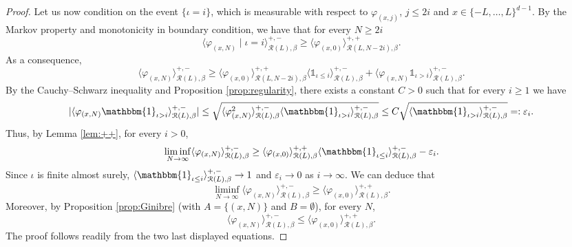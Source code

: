 \documentclass[11pt,a4paper]{article}
\theoremstyle{definition}
\numberwithin{equation}{section}
\newcommand\cR{\mathcal{R}}
\begin{document}
\begin{proof}
Let us now condition on the event $\{\iota = i\}$, which is measurable with respect to $\varphi_{(x,j)}$, $j\leq 2i$ and $x \in \{-L,\ldots,L\}^{d-1}$. By the Markov property and monotonicity in boundary condition, we have that for every $N\geq 2i$
\begin{equation}
\langle \varphi_{(x,N)} 
 \mid \iota = i \rangle^{+,-}_{\cR(L),\beta}\geq  \langle \varphi_{(x,0)} \rangle^{+,+}_{\cR(L,N-2i),\beta}.
\end{equation}
As a consequence,
\begin{equation}
    \langle \varphi_{(x,N)}  \rangle^{+,-}_{\cR(L),\beta}\geq \langle \varphi_{(x,0)} \rangle^{+,+}_{\cR(L,N-2i),\beta}\langle \mathds{1}_{\iota\leq i}\rangle_{\mathcal{R}(L),\beta}^{+,-}+\langle \varphi_{(x,N)}\mathds{1}_{\iota>i}  \rangle^{+,-}_{\cR(L),\beta}.
\end{equation}
By the Cauchy--Schwarz inequality and Proposition \ref{prop:regularity}, there exists a constant $C>0$ such that for every $i\geq 1$ we have
\begin{equation}
|\langle \varphi_{(x,N)} 
\mathbbm{1}_{\iota>i} \rangle^{+,-}_{\cR(L),\beta}|\leq \sqrt{\langle \varphi^2_{(x,N)}  \rangle^{+,-}_{\cR(L),\beta}\langle 
\mathbbm{1}_{\iota>i}  \rangle^{+,-}_{\cR(L),\beta}} 
\leq C\sqrt{\langle 
\mathbbm{1}_{\iota>i}  \rangle^{+,-}_{\cR(L),\beta}}=: \varepsilon_i.
\end{equation}
Thus, by Lemma \ref{lem:++}, for every $i>0$,
\begin{equation}
\liminf_{N\to\infty} \langle \varphi_{(x,N)} 
 \rangle^{+,-}_{\cR(L),\beta}\geq \langle \varphi_{(x,0)} \rangle^{+,+}_{\cR(L),\beta}\langle \mathbbm{1}_{\iota\leq i}  \rangle^{+,-}_{\cR(L),\beta}-\varepsilon_i.
 \end{equation}
 Since $\iota$ is finite almost surely, $\langle \mathbbm{1}_{\iota\leq i}  \rangle^{+,-}_{\cR(L),\beta}\rightarrow 1$ and $\varepsilon_i\rightarrow 0$ as $i\rightarrow \infty$. We can deduce that 
\begin{equation}
\liminf_{N\to\infty} \langle \varphi_{(x,N)} 
 \rangle^{+,-}_{\cR(L),\beta}\geq \langle \varphi_{(x,0)} \rangle^{+,+}_{\cR(L),\beta}.
 \end{equation}
Moreover, by Proposition \ref{prop:Ginibre} (with $A=\{(x,N)\}$ and $B=\emptyset$), for every $N$,
\begin{equation}
    \langle \varphi_{(x,N)}\rangle^{+,-}_{\mathcal{R}(L),\beta}\leq \langle \varphi_{(x,0)} \rangle^{+,+}_{\cR(L),\beta}.
\end{equation}
The proof follows readily from the two last displayed equations.



\end{proof}
\end{document}
